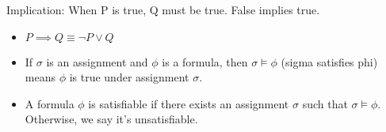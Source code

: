 \documentclass{article}
\begin{document}
Implication: When P is true, Q must be true. False implies true.

\begin{itemize}
\item $P \implies Q \equiv \neg P \lor Q$
\item If $\sigma$ is an assignment and $\phi$ is a formula, then $\sigma \models \phi$ (sigma satisfies phi) means $\phi$ is true under assignment $\sigma$.
\item A formula $\phi$ is satisfiable if there exists an assignment $\sigma$ such that $\sigma \models \phi$. Otherwise, we say it's unsatisfiable.
\end{itemize}
\end{document}
